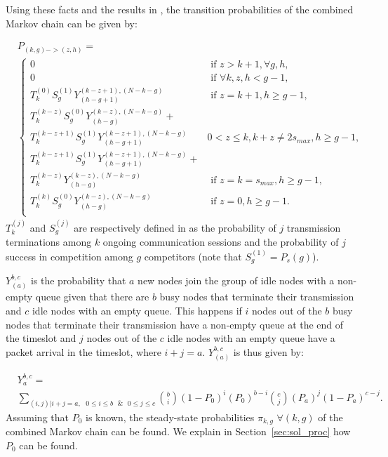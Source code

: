 \documentclass[12pt,journal,oneside,onecolumn]{IEEEtran}
\begin{document}
Using these facts and the results in \cite[Eq. (16)]{pawelczak09}, the transition probabilities of the combined Markov chain can be given by:


\scriptsize
\begin{align}
&P_{(k,g)->(z,h)} = \nonumber \\
&\begin{cases}
0& \mbox{ if } z>k+1, \forall g,h, \\
0& \mbox{ if } \forall k,z,  h < g-1, \\
T_k^{(0)}S_{g}^{(1)} Y_{(h-g+1)}^{(k-z+1),(N-k-g)}& \mbox{ if } z=k+1,  h \geq g-1,  \\
T_k^{(k-z)}S_{g}^{(0)} Y_{(h-g)}^{(k-z),(N-k-g)} + \\
T_k^{(k-z+1)}S_{g}^{(1)} Y_{(h-g+1)}^{(k-z+1),(N-k-g)}&0< z\leq k, k+z\neq 2s_{max}, h\geq g-1,\\
T_k^{(k-z+1)}S_{g}^{(1)} Y_{(h-g+1)}^{(k-z+1),(N-k-g)} +\\
T_k^{(k-z)}Y_{(h-g)}^{(k-z),(N-k-g)}& \mbox{ if } z=k=s_{max}, h\geq g-1,\\
T_k^{(k)}S_{g}^{(0)} Y_{(h-g)}^{(k-z),(N-k-g)}& \mbox{ if } z=0, h\geq g-1.\\
\end{cases}
\label{eq:comb_trans_prob}
\end{align}
\normalsize
$T_k^{(j)}$ and $S_g^{(j)}$ are respectively defined in \cite [Eqs. (14),(15)]{pawelczak09} 
as the probability of $j$ transmission terminations among $k$ ongoing communication sessions 
and the probability of $j$ success in competition among $g$ competitors (note that $S_g^{(1)}=P_s(g)$). 

$Y^{b,c}_{(a)}$ is the probability that $a$ new nodes join the group of idle nodes with a non-empty queue given that there are $b$ busy nodes 
that terminate their transmission and $c$ idle nodes with an empty queue. 
This happens if $i$ nodes out of the $b$ busy nodes 
that terminate their transmission have a non-empty queue at the end of the timeslot and $j$ nodes out of the
$c$ idle nodes with an empty queue have a packet arrival in the timeslot, where $i+j=a$. $Y^{b,c}_{(a)}$ is thus given by:

\footnotesize
\begin{align}
& Y_{a}^{b,c}= \nonumber \\
&\sum_{(i,j)|i+j=a, \mbox{ } 0\leq i\leq b \mbox{ $\&$ } 0\leq j\leq c} {{b\choose i} (1-P_0)^{i} (P_0)^{b-i} {c\choose j} (P_a)^{j} (1-P_a)^{c-j}}.
\label{eq:Y_a^bc}
\end{align}
\normalsize
Assuming that $P_0$ is known, the steady-state probabilities $\pi_{k,g}$  $\forall (k,g)$ of the combined Markov chain can be found. 
We explain in Section~\ref{sec:sol_proc} how $P_0$ can be found. 
\end{document}
